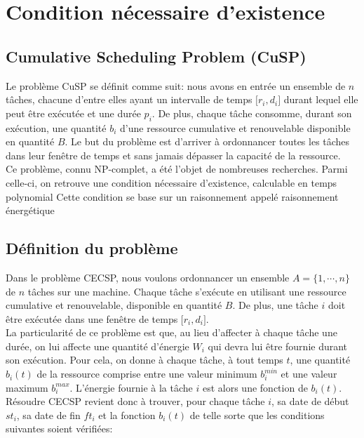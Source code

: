 \documentclass{report}
\begin{document}
\section{Condition nécessaire d'existence}




\subsection{Cumulative Scheduling Problem (CuSP)}
	
Le problème CuSP se définit comme suit: nous avons en entrée un ensemble de $n$ tâches, chacune d'entre elles ayant un intervalle de temps ${[}r_i,d_i{]}$ durant lequel elle peut être exécutée et une durée $p_i$. De plus, chaque tâche consomme, durant son exécution, une quantité $b_i$ d'une ressource cumulative et renouvelable disponible en quantité $B$. Le but du problème est d'arriver à ordonnancer toutes les tâches dans leur fenêtre de temps et sans jamais dépasser la capacité de la ressource.\\
	
Ce problème, connu NP-complet, a été l'objet de nombreuses recherches. Parmi celle-ci, on retrouve une condition nécessaire d'existence, calculable en temps polynomial %
Cette condition se base sur un raisonnement appelé raisonnement énergétique %

	
\subsection{Définition du problème}
	
Dans le problème CECSP, nous voulons ordonnancer un ensemble $A=\{1, \cdots , n\}$ de $n$ tâches sur une machine. Chaque tâche s'exécute en utilisant une ressource cumulative et renouvelable, disponible en quantité $B$. De plus, une tâche $i$ doit être exécutée dans une fenêtre de temps ${[}r_i,d_i{]}$.\\
La particularité de ce problème est que, au lieu d'affecter à chaque tâche une durée, on lui affecte une quantité d'énergie $W_i$ qui devra lui être fournie durant son exécution. Pour cela, on donne à chaque tâche, à tout temps $t$, une quantité $b_i(t)$ de la ressource comprise entre une valeur minimum $b_i^{min}$ et une valeur maximum $b_i^{max}$. L'énergie fournie à la tâche $i$ est alors une fonction de $b_i(t)$.\\
Résoudre CECSP revient donc à trouver, pour chaque tâche $i$, sa date de début $st_i$, sa date de fin $ft_i$ et la fonction $b_i(t)$ de telle sorte que les conditions suivantes soient vérifiées:
\end{document}
